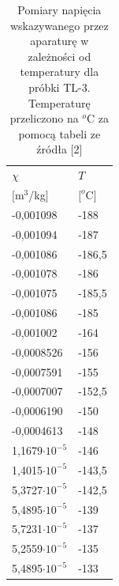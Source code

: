 \documentclass[11pt]{article}
\begin{document}
\begin{table}[h!]
\centering
\caption{Pomiary napięcia wskazywanego przez aparaturę w zależności od temperatury dla próbki TL-3. Temperaturę przeliczono na $^o$C za pomocą tabeli
ze źródła [2]}
\label{3}
\begin{tabular}{|l|l|}
\hline
$\chi$ & $T$ \\  
$[$m$^3$/kg$]$ & $[ ^o$C$]$ \\ \hline
-0,001098        & -188   \\ \hline
-0,001094        & -187   \\ \hline
-0,001086         & -186,5 \\ \hline
-0,001078        & -186   \\ \hline
-0,001075        & -185,5 \\ \hline
-0,001086         & -185   \\ \hline
-0,001002        & -164   \\ \hline
-0,0008526        & -156   \\ \hline
-0,0007591        & -155   \\ \hline
-0,0007007         & -152,5 \\ \hline
-0,0006190        & -150   \\ \hline
-0,0004613        & -148   \\ \hline
1,1679$\cdot 10^{-5}$ & -146   \\ \hline
1,4015$\cdot 10^{-5}$& -143,5 \\ \hline
5,3727$\cdot 10^{-5}$& -142,5 \\ \hline
5,4895$\cdot 10^{-5}$& -139   \\ \hline
5,7231$\cdot 10^{-5}$& -137   \\ \hline
5,2559$\cdot 10^{-5}$& -135   \\ \hline
5,4895$\cdot 10^{-5}$& -133   \\ \hline
\end{tabular}
\end{table}
\end{document}
